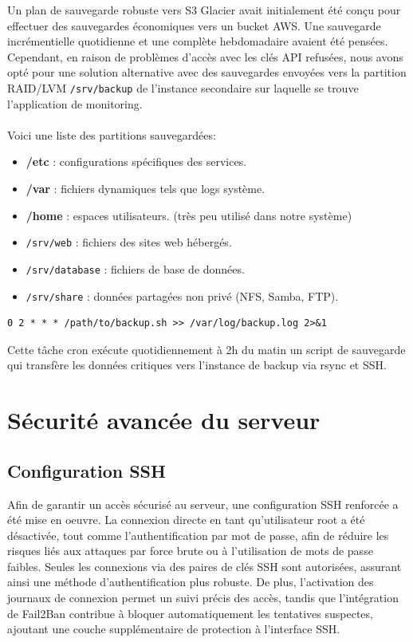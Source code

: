 \documentclass[a4paper,12pt]{article}
\begin{document}
Un plan de sauvegarde robuste vers S3 Glacier avait initialement été conçu pour effectuer des sauvegardes économiques vers un bucket AWS. Une sauvegarde incrémentielle quotidienne et une complète hebdomadaire avaient été pensées. Cependant, en raison de problèmes d'accès avec les clés API refusées, nous avons opté pour une solution alternative avec des sauvegardes envoyées vers la partition RAID/LVM  \texttt{/srv/backup} de l'instance secondaire sur laquelle se trouve l'application de monitoring.\\\\
Voici une liste des partitions sauvegardées:
\begin{itemize}
	\item \textbf{/etc} : configurations spécifiques des services.
	\item \textbf{/var} : fichiers dynamiques tels que logs système.
	\item \textbf{/home} : espaces utilisateurs. (très peu utilisé dans notre système)
	\item \texttt{/srv/web} : fichiers des sites web hébergés.
	\item \texttt{/srv/database} : fichiers de base de données.
	\item \texttt{/srv/share} : données partagées non privé (NFS, Samba, FTP).
\end{itemize}

\begin{lstlisting}[caption={Configuration Sauvegarde – /etc/crontab}]
0 2 * * * /path/to/backup.sh >> /var/log/backup.log 2>&1
\end{lstlisting}

Cette tâche cron exécute quotidiennement à 2h du matin un script de sauvegarde qui transfère les données critiques vers l'instance de backup via rsync et SSH.

\clearpage
\section{Sécurité avancée du serveur}

\subsection{Configuration SSH}

Afin de garantir un accès sécurisé au serveur, une configuration SSH renforcée a été mise en oeuvre. La connexion directe en tant qu'utilisateur root a été désactivée, tout comme l'authentification par mot de passe, afin de réduire les risques liés aux attaques par force brute ou à l'utilisation de mots de passe faibles. Seules les connexions via des paires de clés SSH sont autorisées, assurant ainsi une méthode d'authentification plus robuste. De plus, l'activation des journaux de connexion permet un suivi précis des accès, tandis que l'intégration de Fail2Ban contribue à bloquer automatiquement les tentatives suspectes, ajoutant une couche supplémentaire de protection à l'interface SSH.
\end{document}
